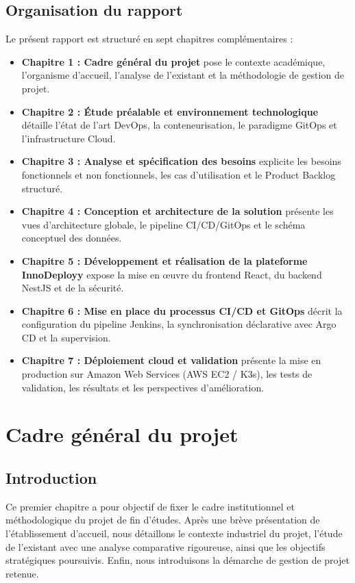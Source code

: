 \documentclass[12pt,a4paper,oneside]{report}
\begin{document}
\section*{Organisation du rapport}
Le présent rapport est structuré en sept chapitres complémentaires :
\begin{itemize}[label=--]
    \item \textbf{Chapitre 1 : Cadre général du projet} pose le contexte académique, l'organisme d'accueil, l'analyse de l'existant et la méthodologie de gestion de projet.
    \item \textbf{Chapitre 2 : Étude préalable et environnement technologique} détaille l'état de l'art DevOps, la conteneurisation, le paradigme GitOps et l'infrastructure Cloud.
    \item \textbf{Chapitre 3 : Analyse et spécification des besoins} explicite les besoins fonctionnels et non fonctionnels, les cas d'utilisation et le Product Backlog structuré.
    \item \textbf{Chapitre 4 : Conception et architecture de la solution} présente les vues d'architecture globale, le pipeline CI/CD/GitOps et le schéma conceptuel des données.
    \item \textbf{Chapitre 5 : Développement et réalisation de la plateforme InnoDeployy} expose la mise en œuvre du frontend React, du backend NestJS et de la sécurité.
    \item \textbf{Chapitre 6 : Mise en place du processus CI/CD et GitOps} décrit la configuration du pipeline Jenkins, la synchronisation déclarative avec Argo CD et la supervision.
    \item \textbf{Chapitre 7 : Déploiement cloud et validation} présente la mise en production sur Amazon Web Services (AWS EC2 / K3s), les tests de validation, les résultats et les perspectives d'amélioration.
\end{itemize}

\clearpage

\chapter{Cadre général du projet}

\section{Introduction}
Ce premier chapitre a pour objectif de fixer le cadre institutionnel et méthodologique du projet de fin d'études. Après une brève présentation de l'établissement d'accueil, nous détaillons le contexte industriel du projet, l'étude de l'existant avec une analyse comparative rigoureuse, ainsi que les objectifs stratégiques poursuivis. Enfin, nous introduisons la démarche de gestion de projet retenue.
\end{document}
